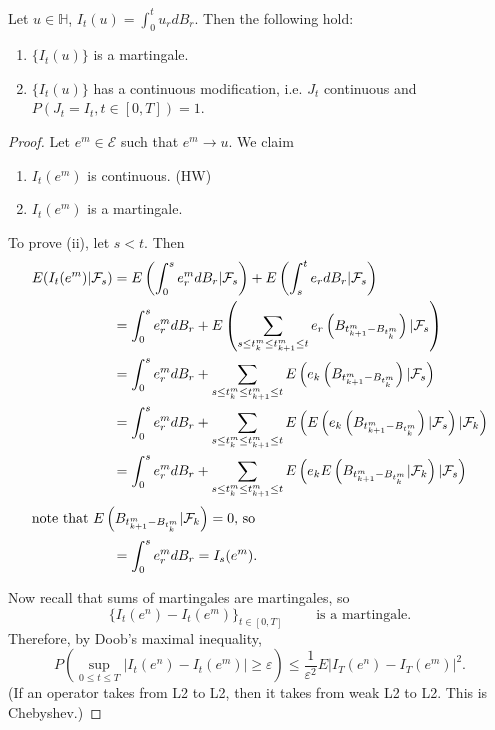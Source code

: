 \begin{theorem}
	\label{thm:ito-martingale-continuous}
	Let $u \in \mathbb{H}$, $I_t(u) = \int _0^t u_r d B_r$. Then the following hold:
	\begin{enumerate}
		\item $\{I_t(u)\} $ is a martingale.
		\item $\{I_t(u)\} $ has a continuous modification, i.e. $J_t$ continuous and $P(J_t = I_t, t \in [0,T]) = 1$.
	\end{enumerate}
\end{theorem}
\begin{proof}
	Let $e^m \in \mathcal{E}$ such that $e^m \to  u$. We claim
	\begin{enumerate}
		\item $I_t(e^m)$ is continuous. (HW)
		\item $I_t(e^m)$ is a martingale.
	\end{enumerate}
	To prove (ii), let $s < t$. Then
	\begin{align*}
		E(I_t(e^m) | \mathcal{F}_s)
		&= E\left(\int _0^s e^m_r d B_r  | \mathcal{F}_s\right) + E\left(\int _s^t e_r d B_r | \mathcal{F}_s\right)  \\
		&= \int _0^s e^m_r d B_r + E\left(\sum_{s \le t_k^m \le  t_{k+1}^m \le t} e_r \left( B_{t_{k+1}^m - B_{t_k^m}} \right)  | \mathcal{F}_s\right)  \\
		&= \int _0^s e^m_r d B_r + \sum_{s \le t_k^m \le  t_{k+1}^m \le t} E \left(e_k \left( B_{t_{k+1}^m - B_{t_k^m}} \right)  | \mathcal{F}_s\right)  \\
		&= \int _0^s e^m_r d B_r + \sum_{s \le t_k^m \le  t_{k+1}^m \le t} E \left(E \left(e_k \left( B_{t_{k+1}^m - B_{t_k^m}} \right)  | \mathcal{F}_s\right) | \mathcal{F}_k \right)  \\
		&= \int _0^s e^m_r d B_r + \sum_{s \le t_k^m \le  t_{k+1}^m \le t} E \left(e_k E \left(  B_{t_{k+1}^m - B_{t_k^m}}   | \mathcal{F}_k\right) | \mathcal{F}_s \right)  \\
		\intertext{note that $ E \left(  B_{t_{k+1}^m - B_{t_k^m}}   | \mathcal{F}_k\right)  = 0$, so}
		&= \int _0^s e^m_r d B_r = I_s(e^m)
	.\end{align*}

	Now recall that sums of martingales are martingales, so
	\[
		\{I_t(e^n) - I_t(e^m)\} _{t \in [0,T]} \qquad \text{ is a martingale}
	.\] 
	Therefore, by Doob's maximal inequality,
	\[
		P\left( \sup _{0 \le t\le T} \left| I_t(e^n) - I_t(e^m) \right| \ge \varepsilon \right) 
		\le \frac{1}{\varepsilon^2} E \left| I_T(e^n) - I_T(e^m) \right| ^2
	.\] 
	(If an operator takes from L2 to L2, then it takes from weak L2 to L2. This is Chebyshev.) 


\end{proof}
